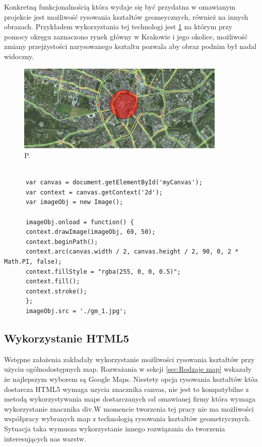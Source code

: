 Konkretną funkcjonalnością która wydaje się być przydatna w omawianym projekcie jest możliwość rysowania kształtów geomeycznych, również na innych obrazach. Przykładem wykorzystania tej technologi jest \ref{fig:canvas1} na którym przy pomocy okręgu zaznaczono rynek główny w Krakowie i jego okolice, możliwość zmiany przejżystości narysowanego kształtu pozwala aby obraz podnim był nadal widoczny.

  \begin{figure}[H]
  \centering
    \includegraphics[width=100mm]{ge/canvas1.jpg}
  \caption{P.}
  \label{fig:canvas1}
\end{figure}

\lstset{language=JavaScript}
\begin{lstlisting}[caption=json]

      var canvas = document.getElementById('myCanvas');
      var context = canvas.getContext('2d');
      var imageObj = new Image();
	
      imageObj.onload = function() {
      context.drawImage(imageObj, 69, 50);
	  context.beginPath();
      context.arc(canvas.width / 2, canvas.height / 2, 90, 0, 2 * Math.PI, false);
      context.fillStyle = "rgba(255, 0, 0, 0.5)";
      context.fill();
      context.stroke();
      };
      imageObj.src = './gm_1.jpg';

\end{lstlisting}

\subsection{Wykorzystanie HTML5}
\label{subsec:htmluse}

Wstępne założenia zakładały wykorzystanie możliwości rysowania kształtów przy użyciu ogólnodostępnych map. Rozważania w sekcji \ref{sec:Rodzaje map} wskazały że najlepszym wyborem są Google Maps. Niestety opcja rysowania kształtów któa dostarcza HTML5 wymaga uzycia znacznika canvas, nie jest to kompatybilne z metodą wykorzystywania maps dostarczanych od omawianej firmy która wymaga wykorzystanie znacznika div.W momencie tworzenia tej pracy nie ma możliwości współpracy wybranych map z technologią rysowania kształtów geometrycznych. Sytuacja taka wymusza wykorzystanie innego rozwiązania do tworzenia interesujących nas warstw.

